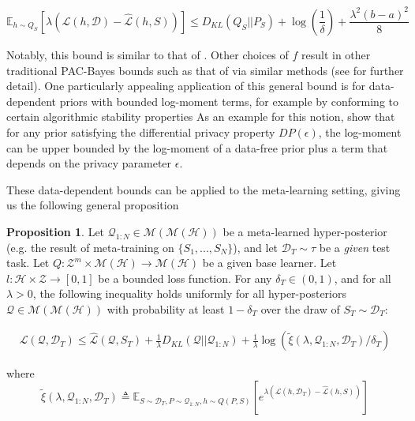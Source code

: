 \documentclass{article}
\theoremstyle{definition}
\newtheorem{proposition}[theorem]{Proposition}
\newcommand{\Expect}[2]{\mathbb{E}_{#1}\left [#2 \right ]}
\begin{document}
\begin{equation} \label{eq:bound-aml-datafree}
\Expect{h\sim Q_S}{\lambda(\mathcal{L}(h,\mathcal{D})-\hat{\mathcal{L}}(h, S))} \leq D_{KL}(Q_S||P_S)+\log\left (\frac{1}{\delta}\right ) + \frac{\lambda^2(b-a)^2}{8}
\end{equation}


Notably, this bound is similar to that of \citet{Catoni2004}. Other choices of $f$ result in other traditional PAC-Bayes bounds such as that of \citet{Mcallester} via similar methods (see \citet{Rivasplata2020} for further detail). 
One particularly appealing application of this general bound is for data-dependent priors with bounded log-moment terms, for example by conforming to certain algorithmic stability properties 
As an example for this notion, \citet{Rivasplata2020} show that for any prior satisfying the differential privacy property $DP(\epsilon)$, the log-moment can be upper bounded by the log-moment of a data-free prior plus a term that depends on the privacy parameter $\epsilon$. 

These data-dependent bounds can be applied to the meta-learning setting, giving us the following general proposition

\begin{proposition} \label{thm:main-result}
	Let $\mathcal{Q}_{1:N}\in \mathcal{M}(\mathcal{M}(\mathcal{H}))$ be a meta-learned hyper-posterior (e.g. the result of meta-training on $\{S_1,...,S_N\}$), and let $\mathcal{D}_T\sim \tau$ be a \emph{given} test task. Let $Q: \mathcal{Z}^m\times\mathcal{M}(\mathcal{H})\rightarrow \mathcal{M}(\mathcal{H})$ be a given base learner. Let $l: \mathcal{H}\times \mathcal{Z}\rightarrow [0, 1]$ be a bounded loss function.
	For any $\delta_T \in (0,1)$, and for all $\lambda>0$, the following inequality holds uniformly for all hyper-posteriors $\mathcal{Q}\in \mathcal{M}(\mathcal{M}(\mathcal{H}))$ with probability at least $1-\delta_T$ over the draw of $S_T\sim \mathcal{D}_T$:
	
	\begin{align} \label{eq:main-result-generic}
	\mathcal{L}(\mathcal{Q}, \mathcal{D}_T) \leq \hat{\mathcal{L}}(\mathcal{Q}, S_T) + \frac{1}{\lambda}D_{KL}(\mathcal{Q}||\mathcal{Q}_{1:N})
	+\frac{1}{\lambda}\log\left ( \tilde{\xi}(\lambda,\mathcal{Q}_{1:N},\mathcal{D}_T)/\delta_T\right )
	\end{align}
	
	
	where 
	$$\tilde{\xi}(\lambda,\mathcal{Q}_{1:N},\mathcal{D}_T)\triangleq \Expect{S\sim \mathcal{D}_T, P\sim \mathcal{Q}_{1:N}, h\sim Q(P,S)}{e^{\lambda\left (\mathcal{L}(h, \mathcal{D}_T)-\hat{\mathcal{L}}(h, S)\right )}}$$
\end{proposition}
\end{document}
